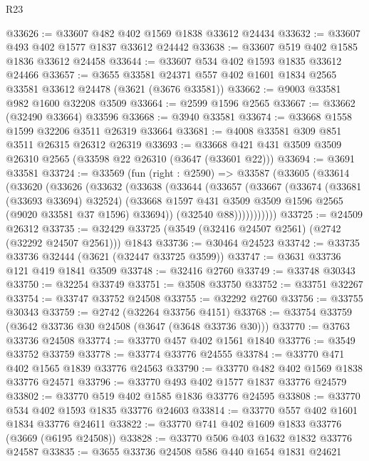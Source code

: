 \begin{lexlean}{R23}
\begin{coremodule}
@33626 := @33607 @482 @402 @1569 @1838 @33612 @24434
@33632 := @33607 @493 @402 @1577 @1837 @33612 @24442
@33638 := @33607 @519 @402 @1585 @1836 @33612 @24458
@33644 := @33607 @534 @402 @1593 @1835 @33612 @24466
@33657 := @3655
    @33581
    @24371
    @557
    @402
    @1601
    @1834
    @2565
    @33581
    @33612
    @24478
    (@3621 (@3676 @33581))
@33662 := @9003 @33581 @982 @1600 @32208 @3509
@33664 := @2599 @1596 @2565
@33667 := @33662 (@32490 @33664) @33596
@33668 := @3940 @33581
@33674 := @33668 @1558 @1599 @32206 @3511 @26319 @33664
@33681 := @4008 @33581 @309 @851 @3511 @26315 @26312 @26319
@33693 := @33668 @421 @431 @3509 @3509 @26310 @2565 (@33598 @22 @26310 (@3647 (@33601 @22)))
@33694 := @3691 @33581
@33724 := @33569
    (fun (right : @2590) =>
    @33587
      (@33605
        (@33614
          (@33620
            (@33626
              (@33632
                (@33638
                  (@33644
                    (@33657
                      (@33667
                        (@33674
                          (@33681 (@33693 @33694) @32524)
                          (@33668
                            @1597
                            @431
                            @3509
                            @3509
                            @1596
                            @2565
                            (@9020 @33581 @37 @1596)
                            @33694))
                        (@32540 @88)))))))))))
@33725 := @24509 @26312
@33735 := @32429 @33725 (@3549 (@32416 @24507 @2561) (@2742 (@32292 @24507 @2561))) @1843
@33736 := @30464 @24523
@33742 := @33735 @33736 @32444 (@3621 (@32447 @33725 @3599))
@33747 := @3631 @33736 @121 @419 @1841 @3509
@33748 := @32416 @2760
@33749 := @33748 @30343
@33750 := @32254 @33749
@33751 := @3508 @33750
@33752 := @33751 @32267
@33754 := @33747 @33752 @24508
@33755 := @32292 @2760
@33756 := @33755 @30343
@33759 := @2742 (@32264 @33756 @4151)
@33768 := @33754 @33759 (@3642 @33736 @30 @24508 (@3647 (@3648 @33736 @30)))
@33770 := @3763 @33736 @24508
@33774 := @33770 @457 @402 @1561 @1840
@33776 := @3549 @33752 @33759
@33778 := @33774 @33776 @24555
@33784 := @33770 @471 @402 @1565 @1839 @33776 @24563
@33790 := @33770 @482 @402 @1569 @1838 @33776 @24571
@33796 := @33770 @493 @402 @1577 @1837 @33776 @24579
@33802 := @33770 @519 @402 @1585 @1836 @33776 @24595
@33808 := @33770 @534 @402 @1593 @1835 @33776 @24603
@33814 := @33770 @557 @402 @1601 @1834 @33776 @24611
@33822 := @33770 @741 @402 @1609 @1833 @33776 (@3669 (@6195 @24508))
@33828 := @33770 @506 @403 @1632 @1832 @33776 @24587
@33835 := @3655 @33736 @24508 @586 @440 @1654 @1831 @24621

\end{coremodule}
\end{lexlean}
